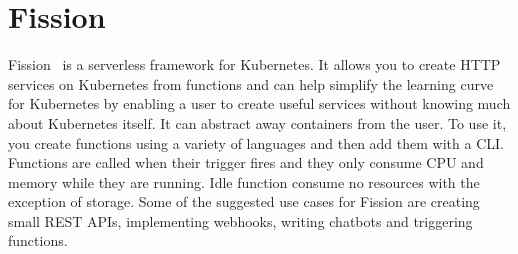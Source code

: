\section{Fission}
Fission~\cite{hid-sp18-521-FissionBlog} is a serverless framework for
Kubernetes. It allows you to create HTTP services on Kubernetes from
functions and can help simplify the learning curve for Kubernetes by
enabling a user to create useful services without knowing much about
Kubernetes itself. It can abstract away containers from the user. 
To use it, you create functions using a variety of languages and then
add them with a CLI\@. Functions are called when their trigger fires and 
they only consume CPU and memory while they are running. Idle function 
consume no resources with the exception of storage. Some of the 
suggested use cases for Fission are creating small REST APIs, 
implementing webhooks, writing chatbots and triggering functions.

